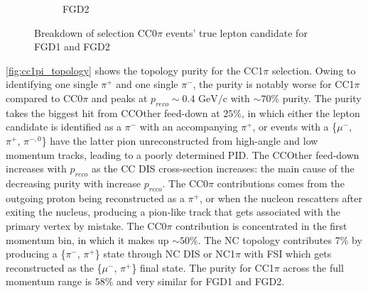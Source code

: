 \begin{figure}[!h]
\begin{subfigure}[t]{0.49\textwidth}
		\caption{FGD2}
	\end{subfigure}
	\caption{Breakdown of selection CC0$\pi$ events' true lepton candidate for FGD1 and FGD2 }
	\label{fig:cc0pi_muon}
\end{figure}

\autoref{fig:cc1pi_topology} shows the topology purity for the CC1$\pi$ selection. Owing to identifying one single $\pi^+$ and one single $\pi^-$, the purity is notably worse for CC1$\pi$ compared to CC0$\pi$ and peaks at $p_{reco}\sim0.4\text{ GeV/c}$ with $\sim70\%$ purity. The purity takes the biggest hit from CCOther feed-down at $25\%$, in which either the lepton candidate is identified as a $\pi^-$ with an accompanying $\pi^+$, or events with a \{$\mu^-$, $\pi^+$, $\pi^{-,0}$\} have the latter pion unreconstructed from high-angle and low momentum tracks, leading to a poorly determined PID. The CCOther feed-down increases with $p_{reco}$ as the CC DIS cross-section increases: the main cause of the decreasing purity with increase $p_{reco}$. The CC0$\pi$ contributions comes from the outgoing proton being reconstructed as a $\pi^+$, or when the nucleon rescatters after exiting the nucleus, producing a pion-like track that gets associated with the primary vertex by mistake. The CC0$\pi$ contribution is concentrated in the first momentum bin, in which it makes up $\sim50\%$. The NC topology contributes 7\% by producing a \{$\pi^-$, $\pi^+$\} state through NC DIS or NC1$\pi$ with FSI which gets reconstructed as the \{$\mu^-$, $\pi^+$\} final state. The purity for CC1$\pi$ across the full momentum range is $58\%$ and very similar for FGD1 and FGD2.
